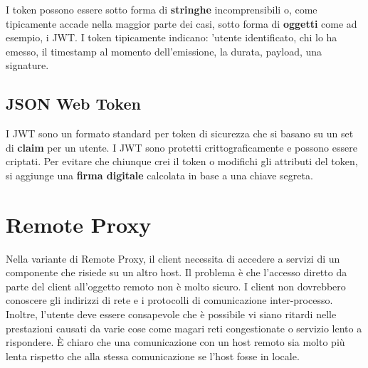 I token possono essere sotto forma di \textbf{stringhe} incomprensibili o, come tipicamente accade nella maggior parte dei casi, sotto forma di \textbf{oggetti} come ad esempio, i JWT. I token tipicamente indicano: ’utente identificato, chi lo ha emesso, il timestamp al momento dell’emissione, la durata, payload, una signature.
\subsection{JSON Web Token}
I JWT sono un formato standard per token di sicurezza che si basano su un set di \textbf{claim} per un utente. I JWT sono protetti crittograficamente e possono essere criptati.
Per evitare che chiunque crei il token o modifichi gli attributi del token, si aggiunge una \textbf{firma digitale} calcolata in base a una chiave segreta.

\section{Remote Proxy}
Nella variante di Remote Proxy, il client necessita di accedere a servizi di un componente che risiede su un altro host.
Il problema è che l’accesso diretto da parte del client all’oggetto remoto non è molto sicuro. I client non dovrebbero conoscere gli indirizzi di rete e i protocolli di comunicazione inter-processo. Inoltre, l'utente deve essere consapevole che è possibile vi siano ritardi nelle prestazioni causati da varie cose come magari reti congestionate o servizio lento a rispondere. È chiaro che una comunicazione con un host remoto sia molto più lenta rispetto che alla stessa comunicazione se l'host fosse in locale. 

